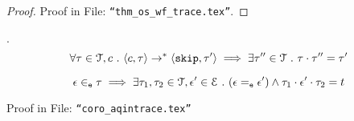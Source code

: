 \begin{proof}
Proof in File: {\tt ``thm\_os\_wf\_trace.tex''}.
% 
\end{proof}
%
\begin{lem}
.
\\
$$
\forall \mathtt{\tau} \in \mathcal{T}, c ~.~
\langle c, \mathtt{\tau} \rangle \rightarrow^{*} \langle \mathtt{skip}, \mathtt{\tau}' \rangle 
\implies \exists \mathtt{\tau}'' \in \mathcal{T} ~.~ \mathtt{\tau} \cdot \mathtt{\tau}'' = \mathtt{\tau}'
$$
\end{lem}
%
\begin{coro}
\label{coro:aqintrace}
\[
\mathtt{\epsilon} \in_{\mathtt{e}} \mathtt{\tau} \implies \exists \mathtt{\tau}_1, \mathtt{\tau}_2 \in \mathcal{T}, 
\mathtt{\epsilon}' \in \mathcal{E} ~.~ (\mathtt{\epsilon} =_{\mathtt{e}} \mathtt{\epsilon}') \land \mathtt{\tau}_1 \cdot \mathtt{\epsilon}' \cdot \mathtt{\tau}_2 = t  
\]
\end{coro}
\begin{subproof}
Proof in File: {\tt ``coro\_aqintrace.tex''}
% 
%
\end{subproof}
%
%
%
%
%

%
%
%
%
%
%
%
% 
%
\clearpage